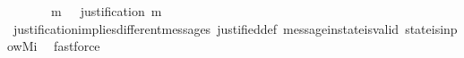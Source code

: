 \begin{isabellebody}
\ \ {\isachardoublequoteopen}{\isasymforall}\ {\isasymsigma}\ {\isasymin}\ {\isasymSigma}{\isachardot}\ {\isasymforall}\ m\ {\isasymin}\ {\isasymsigma}{\isachardot}\ justification\ m\ {\isasymsubset}\ {\isasymsigma}{\isachardoublequoteclose}\isanewline
%
\isadelimproof
\ \ %
\endisadelimproof
%
\isatagproof
{}\isamarkupfalse%
\ justification{\isacharunderscore}implies{\isacharunderscore}different{\isacharunderscore}messages\ justified{\isacharunderscore}def\ message{\isacharunderscore}in{\isacharunderscore}state{\isacharunderscore}is{\isacharunderscore}valid\ state{\isacharunderscore}is{\isacharunderscore}in{\isacharunderscore}pow{\isacharunderscore}Mi\ \isamarkupfalse%
\ fastforce%
\endisatagproof
{\isafoldproof}%
%
\isadelimproof
\isanewline
%
\endisadelimproof
%
\isadelimtheory
\isanewline
%
\endisadelimtheory
%
\isatagtheory
{}\isamarkupfalse%
%
\endisatagtheory
{\isafoldtheory}%
%
\isadelimtheory
%
\endisadelimtheory
%
\end{isabellebody}%
\endinput
